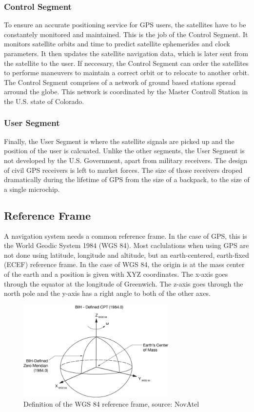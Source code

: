 \subsubsection{Control Segment}

To ensure an accurate positioning service for GPS users, the satellites have to be constantely monitored and maintained.
This is the job of the Control Segment.
It monitors satellite orbits and time to predict satellite ephemerides and clock parameters.
It then updates the satellite navigation data, which is later sent from the satellite to the user.
If neccesary, the Control Segment can order the satellites to performe maneuvers to maintain a correct orbit or to relocate to another orbit.
The Control Segment comprises of a network of ground based stations spread arround the globe.
This network is coordinated by the Master Controll Station in the U.S. state of Colorado.

\subsubsection{User Segment}

Finally, the User Segment is where the satellite signals are picked up and the position of the user is calcuated.
Unlike the other segments, the User Segment is not developed by the U.S. Government, apart from military receivers.
The design of civil GPS receivers is left to market forces.
The size of those receivers droped dramatically during the lifetime of GPS from the size of a backpack, to the size of a single microchip.

\subsection{Reference Frame}

A navigation system needs a common reference frame.
In the case of GPS, this is the World Geodic System 1984 (WGS 84).
Most caclulations when using GPS are not done using latitude, longitude and altitude, but an earth-centered, earth-fixed (ECEF) reference frame.
In the case of WGS 84, the origin is at the mass center of the earth and a position is given with XYZ coordinates.
The x-axis goes through the equator at the longitude of Greenwich.
The z-axis goes through the north pole and the y-axis has a right angle to both of the other axes.

\begin{figure}[ht]
 \centering
 \includegraphics[width=0.7\textwidth]{images/WGS84.png}
 \caption{Definition of the WGS 84 reference frame, source: NovAtel}
 \label{fig:wgs84}
\end{figure}


